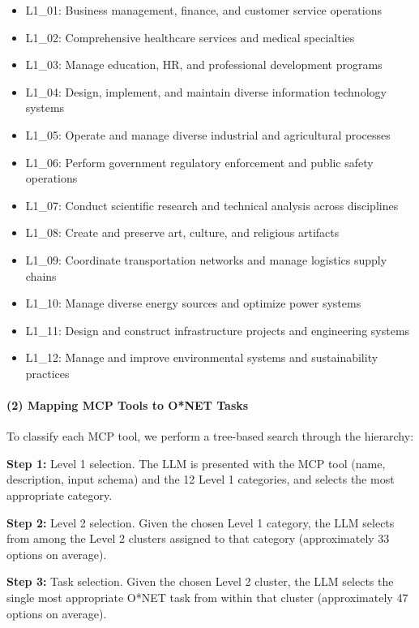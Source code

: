 \documentclass[manuscript,screen,nonacm,oneside]{acmart}
\begin{document}
\begin{itemize}
\item
 L1\_01: Business management, finance, and customer service operations
\item
 L1\_02: Comprehensive healthcare services and medical specialties
\item
 L1\_03: Manage education, HR, and professional development programs
\item
 L1\_04: Design, implement, and maintain diverse information technology systems
\item
 L1\_05: Operate and manage diverse industrial and agricultural processes
\item
 L1\_06: Perform government regulatory enforcement and public safety operations
\item
 L1\_07: Conduct scientific research and technical analysis across disciplines
\item
 L1\_08: Create and preserve art, culture, and religious artifacts
\item
 L1\_09: Coordinate transportation networks and manage logistics supply chains
\item
 L1\_10: Manage diverse energy sources and optimize power systems
\item
 L1\_11: Design and construct infrastructure projects and engineering systems
\item
 L1\_12: Manage and improve environmental systems and sustainability practices
\end{itemize}

\paragraph{(2) Mapping MCP Tools to O*NET Tasks}\label{mapping-mcp-tools-to-onet-tasks}

To classify each MCP tool, we perform a tree-based search through the hierarchy:

\textbf{Step 1:} Level 1 selection. The LLM is presented with the MCP tool (name, description, input schema) and the 12 Level 1 categories, and selects the most appropriate category.

\textbf{Step 2:} Level 2 selection. Given the chosen Level 1 category, the LLM selects from among the Level 2 clusters assigned to that category (approximately 33 options on average).

\textbf{Step 3:} Task selection. Given the chosen Level 2 cluster, the LLM selects the single most appropriate O*NET task from within that cluster (approximately 47 options on average).
\end{document}
